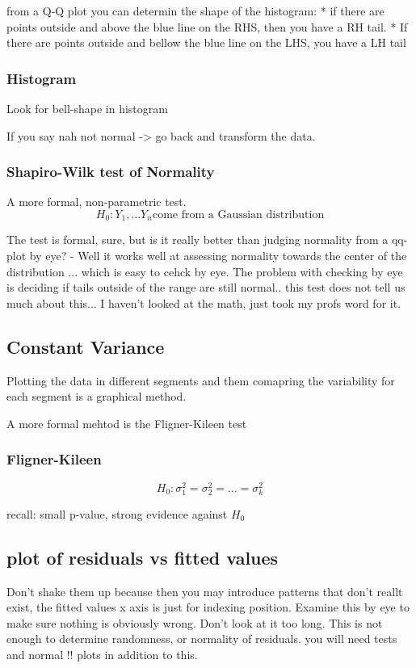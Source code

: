 \documentclass{article}
\begin{document}
from a Q-Q plot you can determin the shape of the histogram: 
* if there are points outside and above the blue line on the RHS, then you have a RH tail.
* If there are points outside and bellow the blue line on the LHS, you have a LH tail

\subsubsection{Histogram}
Look for bell-shape in histogram

If you say nah not normal -> go back and transform the data. 

\subsubsection{Shapiro-Wilk test of Normality}
A more formal, non-parametric test.
\[ H_0: Y_1, \dots Y_n \text{come from a Gaussian distribution} \]

The test is formal, sure, but is it really better than judging normality from a qq-plot by eye? 
- Well it works well at assessing normality towards the center of the distribution ... which is easy to cehck by eye. The problem with checking by eye is deciding if tails outside of the range are still normal.. this test does not tell us much about this... I haven't looked at the math, just took my profs word for it. 

\subsection{Constant Variance}
Plotting the data in different segments and them comapring the variability for each segment is a graphical method. 

A more formal mehtod is the Fligner-Kileen test
\subsubsection{Fligner-Kileen}
\[ H_0: \sigma_1^2 = \sigma_2^2 = \dots = \sigma_k^2 \]

recall: small p-value, strong evidence against $H_0$


\subsection{plot of residuals vs fitted values}
Don't shake them up because then you may introduce patterns that don't reallt exist, the fitted values x axis is just for indexing position. 
Examine this by eye to make sure nothing is obviously wrong. Don't look at it too long. This is not enough to determine randomness, or normality of residuals. you will need tests and normal !! plots in addition to this. 
\end{document}
